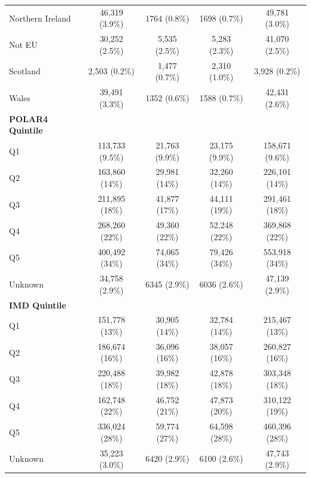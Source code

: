 \begin{table}[htbp]
{\begin{tabular}{lcccc}
Northern Ireland & 46,319 (3.9\%) & 1764 (0.8\%) & 1698 (0.7\%) & 49,781 (3.0\%) \\
Not EU           & 30,252 (2.5\%) & 5,535 (2.5\%) & 5,283 (2.3\%) & 41,070 (2.5\%) \\
Scotland         & 2,503 (0.2\%)  & 1,477 (0.7\%) & 2,310 (1.0\%) & 3,928 (0.2\%) \\
Wales            & 39,491 (3.3\%) & 1352 (0.6\%) & 1588 (0.7\%) & 42,431 (2.6\%) \\
\midrule
\textbf{POLAR4 Quintile} \\
Q1 & 113,733 (9.5\%) & 21,763 (9.9\%) & 23,175 (9.9\%) & 158,671 (9.6\%) \\
Q2 & 163,860 (14\%) & 29,981 (14\%)  & 32,260 (14\%) & 226,101 (14\%) \\
Q3 & 211,895 (18\%) & 41,877 (17\%)  & 44,111 (19\%) & 291,461 (18\%) \\
Q4 & 268,260 (22\%) & 49,360 (22\%)  & 52,248 (22\%) & 369,868 (22\%) \\
Q5 & 400,492 (34\%) & 74,065 (34\%)  & 79,426 (34\%) & 553,918 (34\%) \\
Unknown & 34,758 (2.9\%) & 6345 (2.9\%) & 6036 (2.6\%) & 47,139 (2.9\%) \\
\midrule
\textbf{IMD Quintile} \\
Q1 & 151,778 (13\%) & 30,905 (14\%) & 32,784 (14\%) & 215,467 (13\%) \\
Q2 & 186,674 (16\%) & 36,096 (16\%) & 38,057 (16\%) & 260,827 (16\%) \\
Q3 & 220,488 (18\%) & 39,982 (18\%) & 42,878 (18\%) & 303,348 (18\%) \\
Q4 & 162,748 (22\%) & 46,752 (21\%) & 47,873 (20\%) & 310,122 (19\%) \\
Q5 & 336,024 (28\%) & 59,774 (27\%) & 64,598 (28\%) & 460,396 (28\%) \\
Unknown & 35,223 (3.0\%) & 6420 (2.9\%) & 6100 (2.6\%) & 47,743 (2.9\%) \\
\bottomrule
\end{tabular}
}
\label{tab:balance}
\end{table}
